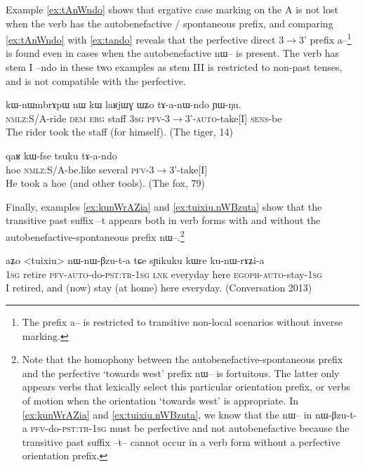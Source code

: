 \documentclass[oldfontcommands,oneside,a4paper,11pt]{article}
\newcommand{\ipa}[1]{{\phon \mbox{#1}}} %
\begin{document}
Example \ref{ex:tAnWndo} shows that ergative case marking on the A is not lost when the verb has the autobenefactive / spontaneous prefix, and comparing \ref{ex:tAnWndo} with  \ref{ex:tando} reveals that the perfective direct 3$\rightarrow$3' prefix \ipa{a--}\footnote{The  prefix \ipa{a--} is restricted to transitive non-local scenarios without inverse marking.  } is found even in cases when the autobenefactive \ipa{nɯ--} is present. The verb has stem I \ipa{--ndo} in these two examples as stem III is restricted to non-past tenses, and is not compatible with the perfective.

 \begin{exe}
\ex \label{ex:tAnWndo}
\gll
\ipa{kɯ-nɯmbrɤpɯ} 	\ipa{nɯ} 	\ipa{kɯ} 	\ipa{laʁjɯɣ} 	\ipa{ɯʑo} 	\ipa{tɤ-a-nɯ-ndo} 	\ipa{ɲɯ-ŋu.}\\
\textsc{nmlz}:S/A-ride \textsc{dem} \textsc{erg} staff \textsc{3sg} \textsc{pfv}-3$\rightarrow$3'-\textsc{auto}-take[I]  \textsc{sens}-be\\ 
\glt The rider took the staff (for himself). (The tiger, 14) 
\end{exe}

 \begin{exe}
\ex \label{ex:tando}
\gll 
\ipa{qaʁ} 	\ipa{kɯ-fse} 	\ipa{tsuku} 	\ipa{tɤ-a-ndo}  \\
hoe  \textsc{nmlz}:S/A-be.like several \textsc{pfv}-3$\rightarrow$3'-take[I]  \\ 
 \glt He took a hoe (and other tools). (The fox, 79)
\end{exe} 

Finally, examples \ref{ex:kunWrAZia} and \ref{ex:tuixiu.nWBzuta} show that the transitive past suffix \ipa{--t}   appears both in verb forms with and without the autobenefactive-spontaneous prefix \ipa{nɯ--}.\footnote{Note that the homophony between the autobenefactive-spontaneous prefix and the perfective `towards west' prefix \ipa{nɯ--} is fortuitous. The latter only appears verbs that lexically select this particular orientation prefix, or verbs of motion when the orientation `towards west' is appropriate. In \ref{ex:kunWrAZia} and \ref{ex:tuixiu.nWBzuta}, we know that the  \ipa{nɯ--} in \ipa{nɯ-βzu-t-a} \textsc{pfv}-do-\textsc{pst:tr-1sg} must be perfective and not autobenefactive because the transitive past suffix \ipa{--t--} cannot occur in a verb form without a perfective orientation prefix.}

 \begin{exe}
\ex \label{ex:kunWrAZia}
\gll 
\ipa{aʑo} 	<tuixiu> 	\ipa{nɯ-nɯ-βzu-t-a} 	\ipa{tɕe} 	\ipa{sɲikuku} 	\ipa{kɯre} 	\ipa{ku-nɯ-rɤʑi-a} \\
\textsc{1sg} retire \textsc{pfv-auto}-do-\textsc{pst:tr-1sg} \textsc{lnk} everyday here \textsc{egoph-auto}-stay-\textsc{1sg} \\
\glt I retired, and (now) stay (at home) here everyday. (Conversation 2013)
\end{exe} 
\end{document}
